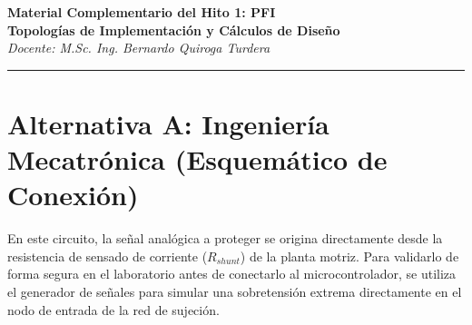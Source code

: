 \documentclass[11pt, a4paper]{article}
\begin{document}
\begin{center}
    {\LARGE \textbf{Material Complementario del Hito 1: PFI}}\\[0.3cm]
    {\large \textbf{Topologías de Implementación y Cálculos de Diseño}}\\
    \textit{Docente: M.Sc. Ing. Bernardo Quiroga Turdera}
    \vspace{0.3cm}
    \hrule
\end{center}

\vspace{0.5cm}

\section{Alternativa A: Ingeniería Mecatrónica (Esquemático de Conexión)}

En este circuito, la señal analógica a proteger se origina directamente desde la resistencia de sensado de corriente ($R_{shunt}$) de la planta motriz. Para validarlo de forma segura en el laboratorio antes de conectarlo al microcontrolador, se utiliza el generador de señales para simular una sobretensión extrema directamente en el nodo de entrada de la red de sujeción.
\end{document}
